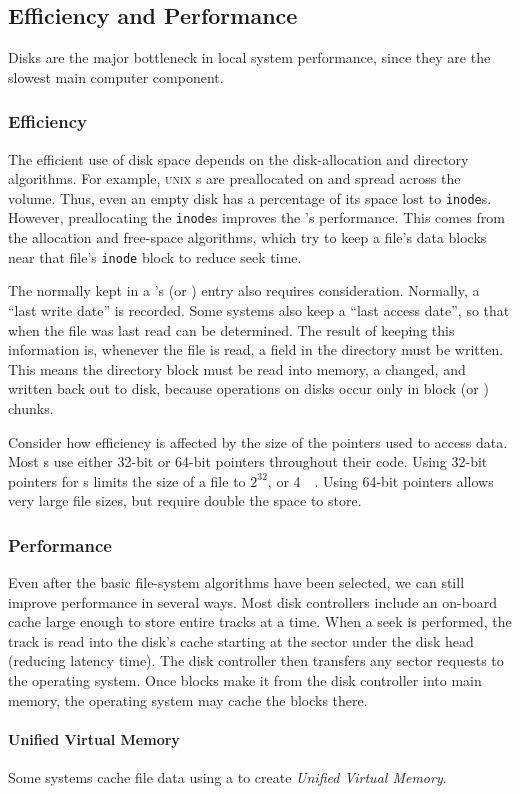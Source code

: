 \subsection{Efficiency and Performance}\label{subsec:Efficiency_Performance}
Disks are the major bottleneck in local system performance, since they are the slowest main computer component.

\subsubsection{Efficiency}\label{subsubsec:Efficiency}
The efficient use of disk space depends on the disk-allocation and directory algorithms.
For example, \textsc{unix} s are preallocated on and spread across the volume.
Thus, even an empty disk has a percentage of its space lost to \texttt{inode}s.
However, preallocating the \texttt{inode}s improves the 's performance.
This comes from the allocation and free-space algorithms, which try to keep a file’s data blocks near that file’s \texttt{inode} block to reduce seek time.

The  normally kept in a 's  (or ) entry also requires consideration.
Normally, a ``last write date'' is recorded.
Some systems also keep a ``last access date'', so that when the file was last read can be determined.
The result of keeping this information is, whenever the file is read, a field in the directory must be written.
This means the directory block must be read into memory, a changed, and written back out to disk, because operations on disks occur only in block (or ) chunks.

Consider how efficiency is affected by the size of the pointers used to access data.
Most s use either 32-bit or 64-bit pointers throughout their code.
Using 32-bit pointers for s limits the size of a file to $2^{32}$, or \SI{4}{\gibi{} \byte{}}.
Using 64-bit pointers allows very large file sizes, but require double the space to store.

\subsubsection{Performance}\label{subsubsec:Performance}
Even after the basic file-system algorithms have been selected, we can still improve performance in several ways.
Most disk controllers include an on-board cache large enough to store entire tracks at a time.
When a seek is performed, the track is read into the disk's cache starting at the sector under the disk head (reducing latency time).
The disk controller then transfers any sector requests to the operating system.
Once blocks make it from the disk controller into main memory, the operating system may cache the blocks there.

\paragraph{Unified Virtual Memory}\label{par:Unified_Virtual_Memory}
Some systems cache file data using a  to create \emph{Unified Virtual Memory}.


